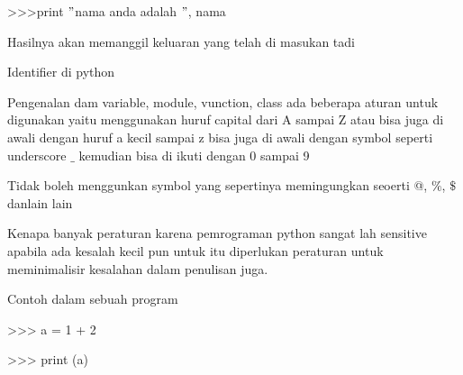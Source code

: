 \vspace{14pt}
\noindent 
{\fontsize{14pt}{14pt}\selectfont >>>print  $ " $nama anda adalah $ " $, nama \\} \par
\vspace{14pt}
\noindent 
{\fontsize{14pt}{14pt}\selectfont Hasilnya akan memanggil keluaran yang telah di masukan tadi \\} \par
\vspace{14pt}
\noindent 
{\fontsize{14pt}{14pt}\selectfont Identifier di python  \\} \par
\vspace{14pt}
\noindent 
{\fontsize{14pt}{14pt}\selectfont Pengenalan dam variable, module, vunction, class ada beberapa aturan untuk digunakan yaitu menggunakan huruf capital dari A sampai Z atau bisa juga di awali dengan huruf a kecil sampai z bisa juga di awali dengan symbol seperti underscore  $  \_  $ kemudian bisa di ikuti dengan 0 sampai 9 \\} \par
\vspace{14pt}
\noindent 
{\fontsize{14pt}{14pt}\selectfont Tidak boleh menggunkan symbol yang sepertinya memingungkan seoerti @, $  \%  $, $  \$  $ danlain lain \\} \par
\vspace{14pt}
\noindent 
{\fontsize{14pt}{14pt}\selectfont Kenapa banyak peraturan karena pemrograman python sangat lah sensitive apabila ada kesalah kecil pun untuk itu diperlukan peraturan untuk meminimalisir kesalahan dalam penulisan juga. \\} \par
\vspace{14pt}
\noindent 
{\fontsize{14pt}{14pt}\selectfont Contoh dalam sebuah program \\} \par
\vspace{14pt}
\noindent 
{\fontsize{14pt}{14pt}\selectfont >>> a = 1 + 2 \\} \par
\vspace{14pt}
\noindent 
{\fontsize{14pt}{14pt}\selectfont >>> print (a)  \\} \par
\vspace{14pt}
\noindent 
{\fontsize{14pt}{14pt} \\} \par
